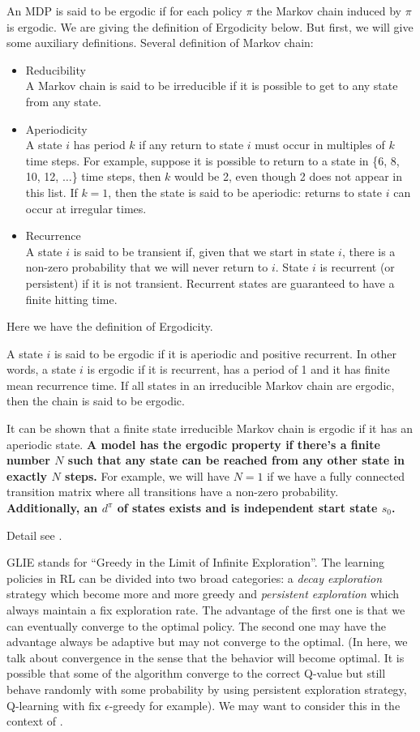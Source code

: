 \documentclass[9pt]{article}
\begin{document}
An MDP is said to be ergodic if for each policy $\pi$ the Markov chain induced by $\pi$ is ergodic.
We are giving the definition of Ergodicity below. But first, we will give some auxiliary definitions.
Several definition of Markov chain:
\begin{itemize}
\item Reducibility\\
A Markov chain is said to be irreducible if it is possible to get to any state from any state.
\item Aperiodicity\\
A state $i$ has period $k$ if any return to state $i$ must occur in multiples of $k$ time steps. For example, suppose it is possible to return to a state in \{6, 8, 10, 12, $\ldots$\} time steps, then $k$ would be 2, even though 2 does not appear in this list. If $k = 1$, then the state is said to be aperiodic: returns to state $i$ can occur at irregular times.
\item Recurrence\\
A state $i$ is said to be transient if, given that we start in state $i$, there is a non-zero probability that we will never return to $i$. State $i$ is recurrent (or persistent) if it is not transient. Recurrent states are guaranteed to have a finite hitting time.
\end{itemize}
Here we have the definition of Ergodicity.

A state $i$ is said to be ergodic if it is aperiodic and positive recurrent. In other words, a state $i$ is ergodic if it is recurrent, has a period of 1 and it has finite mean recurrence time. If all states in an irreducible Markov chain are ergodic, then the chain is said to be ergodic.

It can be shown that a finite state irreducible Markov chain is ergodic if it has an aperiodic state. {\bf A model has the ergodic property if there's a finite number $N$ such that any state can be reached from any other state in exactly $N$ steps.} For example, we will have $N=1$ if we have a fully connected transition matrix where all transitions have a non-zero probability.
{\bf Additionally, an  $d^{\pi}$ of states exists and is independent start state $s_0$.}

Detail see \cite{ortner2007linear}.

GLIE stands for ``Greedy in the Limit of Infinite Exploration''. The learning policies in RL can be divided into two broad categories: a \textit{decay exploration} strategy which become more and more greedy and \textit{persistent exploration} which always maintain a fix exploration rate. The advantage of the first one is that we can eventually converge to the optimal policy. The second one may have the advantage always be adaptive but may not converge to the optimal. (In here, we talk about convergence in the sense that the behavior will become optimal. It is possible that some of the algorithm converge to the correct Q-value but still behave randomly with some probability by using persistent exploration strategy, Q-learning with fix $\epsilon$-greedy for example). We may want to consider this in the context of .
\end{document}
